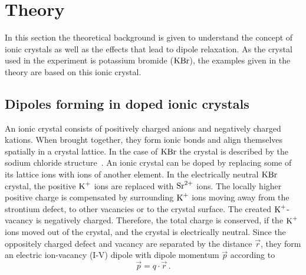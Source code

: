 \section{Theory}
In this section the theoretical background is given to understand the concept of ionic crystals as well as the effects that lead to dipole relaxation.
As the crystal used in the experiment is potassium bromide ($\ce{K}\ce{Br}$), the examples given in the theory are based on this ionic crystal.
\label{sec:Theorie}
\subsection{Dipoles forming in doped ionic crystals}
An ionic crystal consists of positively charged anions and negatively charged kations.
When brought together, they form ionic bonds and align themselves spatially in a crystal lattice.
In the case of $\ce{K}\ce{Br}$ the crystal is described by the sodium chloride structure~\cite[121]{holleman_nils_wiberg_2019}.
\newline\noindent
An ionic crystal can be doped by replacing some of its lattice ions with ions of another element. 
In the electrically neutral $\ce{K}\ce{Br}$ crystal, the positive $\ce{K^+}$ ions are replaced with $\ce{Sr^{2+}}$ ions.
The locally higher positive charge is compensated by surrounding $\ce{K^+}$ ions moving away from the strontium defect, to other vacancies or to the crystal surface.
The created $\ce{K+}$-vacancy is negatively charged.
Therefore, the total charge is conserved, if the $\ce{K^+}$ ions moved out of the crystal, and the crystal is electrically neutral.
\newline\noindent
Since the oppositely charged defect and vacancy are separated by the distance $\vec{r}$, they form an electric ion-vacancy (I-V) dipole with dipole momentum $\vec{p}$ according to
\begin{equation*}
    \vec{p} = q\cdot\vec{r}\,.
\end{equation*}
%
